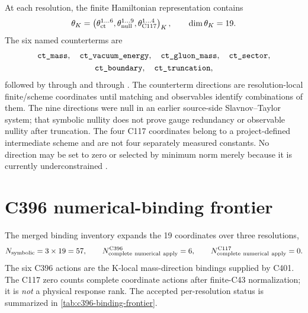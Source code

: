 \documentclass[11pt,oneside]{book}
\newcommand{\statuscode}[1]{\text{\ttfamily\detokenize{#1}}}
\begin{document}
At each resolution, the finite Hamiltonian representation contains
\begin{equation}
 \theta_K=
 \left(
 \theta_{\rm ct}^{1\ldots6},
 \theta_{\rm null}^{1\ldots9},
 \theta_{\rm C117}^{1\ldots4}
 \right)_K,
 \qquad \dim\theta_K=19.
 \label{eq:19-coordinates}
\end{equation}
The six named counterterms are
\begin{equation}
 \begin{gathered}
 \statuscode{ct_mass},\quad \statuscode{ct_vacuum_energy},\quad
 \statuscode{ct_gluon_mass},\quad \statuscode{ct_sector},\\
 \statuscode{ct_boundary},\quad \statuscode{ct_truncation},
 \end{gathered}
\end{equation}
followed by \statuscode{null_1} through \statuscode{null_9} and \statuscode{c_C117_1} through \statuscode{c_C117_4}.  The counterterm directions are resolution-local finite/scheme coordinates until matching and observables identify combinations of them.  The nine directions were null in an earlier source-side Slavnov--Taylor system; that symbolic nullity does not prove gauge redundancy or observable nullity after truncation.  The four C117 coordinates belong to a project-defined intermediate scheme and are not four separately measured constants.  No direction may be set to zero or selected by minimum norm merely because it is currently underconstrained \cite{DWC398Record2026,DWC399Record2026,DWC400ScienceLock2026}.

\section{C396 numerical-binding frontier}
\label{sec:c396-frontier}

The merged binding inventory expands the 19 coordinates over three resolutions,
\begin{equation}
 N_{\rm symbolic}=3\times19=57,
 \qquad
 N_{\rm complete\ numerical\ apply}^{\rm C396}=6,
 \qquad
 N_{\rm complete\ numerical\ apply}^{\rm C117}=0.
 \label{eq:c396-binding-counts}
\end{equation}
The six C396 actions are the K-local mass-direction bindings supplied by C401.  The C117 zero counts complete coordinate actions after finite-C43 normalization; it is \emph{not} a physical response rank.  The accepted per-resolution status is summarized in \cref{tab:c396-binding-frontier}.
\end{document}
